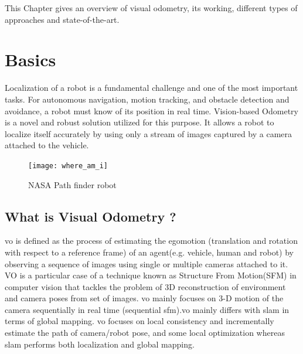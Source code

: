 This Chapter gives an overview of visual odometry, its working, different types of approaches and state-of-the-art.   

\section{Basics}
Localization of a robot is a fundamental challenge and one of the most important tasks. For autonomous navigation, motion tracking, and obstacle detection and avoidance, a robot must know of its position in real time. Vision-based Odometry is a novel and robust solution utilized for this purpose.\cite{Aqel-et-al-2016} It allows a robot to localize itself accurately by using only a stream of images captured by a camera attached to the vehicle.
\begin{figure}[h]
	\centering
	\texttt{[image: where\_am\_i]}
	\caption{NASA Path finder robot\cite{Online}}
\end{figure}
\subsection{What is Visual Odometry ?}
\acrshort{vo} is defined as the process of estimating the egomotion (translation and rotation with respect to a reference frame) of an agent(e.g. vehicle, human and robot) by observing a sequence of images using single or multiple cameras attached to it\cite{KhalidYousif-et-al-2015}. VO is a particular case of a technique known as Structure From Motion(SFM) in computer vision that tackles the problem of 3D reconstruction of environment and camera poses from set of images\cite{ScaramuzzaVO}. \acrshort{vo} mainly focuses on 3-D motion of the camera sequentially in real time (sequential \acrshort{sfm}).\acrshort{vo} mainly differs with \acrshort{slam} in terms of global mapping. \acrshort{vo} focuses on local consistency and incrementally estimate the path of camera/robot pose, and some local optimization whereas \acrshort{slam} performs both localization and global mapping.

